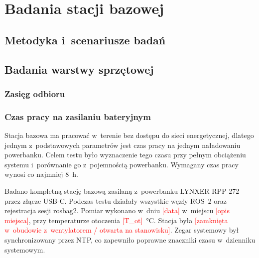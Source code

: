\chapter{Badania stacji bazowej}
\label{chap:badania}

\section{Metodyka i~scenariusze badań}
\label{sec:metodyka}

\section{Badania warstwy sprzętowej}
\label{sec:badania_sprzet}

\subsection{Zasięg odbioru}
\label{sec:zasieg}

\providecommand{\uzup}[1]{\textcolor{red}{[#1]}}

\subsection{Czas pracy na zasilaniu bateryjnym}
\label{sec:czas_pracy}

Stacja bazowa ma pracować w~terenie bez dostępu do sieci energetycznej, dlatego jednym z~podstawowych parametrów jest czas pracy na jednym naładowaniu powerbanku. Celem testu było wyznaczenie tego czasu przy pełnym obciążeniu systemu i~porównanie go z~pojemnością powerbanku. Wymagany czas pracy wynosi co najmniej \SI{8}{h}.

Badano kompletną stację bazową zasilaną z~powerbanku LYNXER RPP-272 przez złącze USB-C. Podczas testu działały wszystkie węzły ROS~2 oraz rejestracja sesji rosbag2. Pomiar wykonano w~dniu \uzup{data} w~miejscu \uzup{opis miejsca}, przy temperaturze otoczenia \uzup{T\_ot}~\si{\degreeCelsius}. Stacja była \uzup{zamknięta w~obudowie z~wentylatorem / otwarta na stanowisku}. Zegar systemowy był synchronizowany przez NTP, co zapewniło poprawne znaczniki czasu w~dzienniku systemowym.

